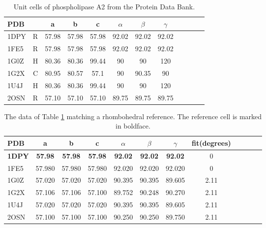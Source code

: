 \documentclass[preprint]{iucr}              %
\numberwithin{equation}{section}
\numberwithin{equation}{section}
\begin{document}
	\begin{table}
		\begin{center}
			\caption{Unit cells of phospholipase A2 from the Protein Data Bank.}		
			\vspace{3mm}
			\begin{tabular}{lccccccccccc}
				\toprule
				PDB &   & a &b &c&$\alpha$&$\beta$&$\gamma$ \\
				\midrule
				1DPY &R& 57.98& 57.98 &57.98 &92.02  &92.02 &92.02 \\ 
				1FE5 &R& 57.98& 57.98 &57.98 &92.02  &92.02 &92.02 \\ 
				1G0Z &H& 80.36& 80.36 &99.44 &90     &90    &120   \\ 
				1G2X &C& 80.95& 80.57 &57.1  &90     &90.35 &90    \\ 
				1U4J &H& 80.36& 80.36 &99.44 &90     &90    &120   \\ 
				2OSN &R& 57.10 & 57.10  &57.10  &89.75  &89.75 &89.75  \\ 
				\bottomrule
			\end{tabular}
			\label{table:LT1}
		\end{center}
	\end{table}	
	
	
	\begin{table}
		\begin{center}
			\caption{The data of Table \ref{table:LT1} matching a rhombohedral reference. The 
				reference cell is marked in boldface.}
			\vspace{3mm}
			\begin{tabular}{lccccccccccc}
				\toprule
				PDB &   a & b & c & $\alpha$ & $\beta$ & $\gamma$ & fit(degrees) \\ \midrule
\textbf{1DPY} & \textbf{57.98}  & \textbf{57.98}  & \textbf{57.98}  &
\textbf{92.02}  & \textbf{92.02}  & \textbf{92.02} & 0 \\ 
1FE5 &57.980& 57.980 & 57.980 & 92.020 & 92.020 & 92.020 & 0    \\
1G0Z &57.020& 57.020 & 57.020 & 90.395 & 90.395 & 89.605 & 2.11 \\
1G2X &57.106& 57.106 & 57.100 & 89.752 & 90.248 & 90.270 & 2.11 \\
1U4J &57.020& 57.020 & 57.020 & 90.395 & 90.395 & 89.605 & 2.11 \\
2OSN &57.100& 57.100 & 57.100 & 90.250 & 90.250 & 89.750 & 2.11 \\

				\bottomrule
			\end{tabular}		
			\label{table:LT2}
		\end{center}
	\end{table}	
	
\end{document}
